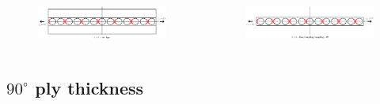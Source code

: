 \documentclass[first,firstsupp,lastsupp,last,hyperref,table]{ETHclass}
\begin{document}
\begin{frame}
\begin{columns}[c]
\begin{column}{0.5\textwidth}
\begin{figure}
\end{figure}
\end{column}
\end{columns}
\begin{columns}[c]
\centering
\begin{column}{0.5\textwidth}
\begin{figure}
\centering
\includegraphics[width=\columnwidth]{zeroplythickness.pdf}
\end{figure}
\end{column}
\begin{column}{0.5\textwidth}
\centering
\begin{figure}
\centering
\includegraphics[width=\columnwidth]{zeroplythickness-eqBC.pdf}
\end{figure}
\end{column}
\end{columns}
\end{frame}

\subsection{$90^{\circ}$ ply thickness}
\end{document}

